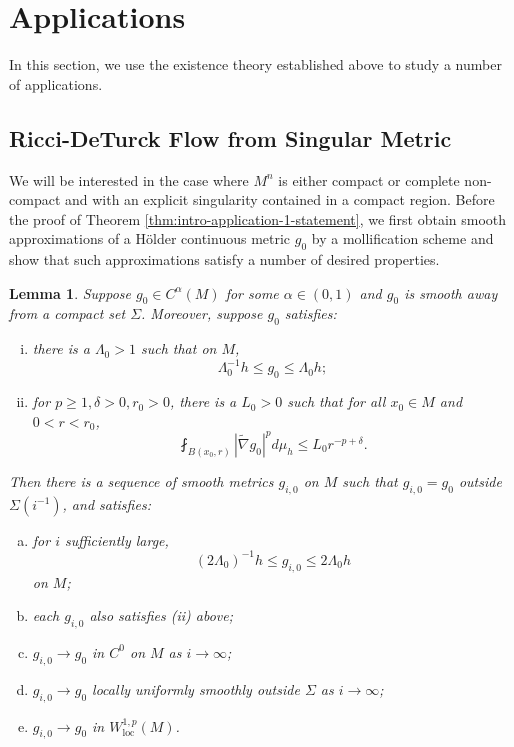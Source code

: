 \documentclass[12pt]{amsart}
\theoremstyle{plain}
\theoremstyle{plain}
\newtheorem{lemma}[subsection]{Lemma}
\theoremstyle{definition}
\theoremstyle{remark}
\numberwithin{equation}{subsection}
\newcommand{\hdel}{\tilde{\nabla}}
\begin{document}
\section{Applications}\label{sec:applications}

In this section, we use the existence theory established above to study a number of applications.

\subsection{Ricci-DeTurck Flow from Singular Metric}

We will be interested in the case where $M^n$ is either compact or complete non-compact and with an explicit singularity contained in a compact region. Before the proof of Theorem \ref{thm:intro-application-1-statement}, we first obtain smooth approximations of a H\"older continuous metric $g_0$ by a mollification scheme and show that such approximations satisfy a number of desired properties.

\begin{lemma}\label{lem:mollification-scheme}
    Suppose $g_0 \in C^\alpha(M)$ for some $\alpha \in (0,1)$ and $g_0$ is smooth away from a compact set $\Sigma$. Moreover, suppose $g_0$ satisfies:
    \begin{enumerate}[(i)]
        \item there is a $\Lambda_0 > 1$ such that on $M$,
        \begin{equation*}
            \Lambda_0^{-1}h \leq g_0 \leq \Lambda_0 h;
        \end{equation*}
        \item for $p \geq 1, \delta > 0, r_0 > 0$, there is a $L_0 > 0$ such that for all $x_0 \in M$ and $0 < r < r_0$,
        \begin{equation*}
            \fint_{B(x_0,r)} |\hdel g_0|^p d\mu_h \leq L_0 r^{-p+\delta}.
        \end{equation*}
    \end{enumerate}
    Then there is a sequence of smooth metrics $g_{i,0}$ on $M$ such that $g_{i,0} = g_0$ outside $\Sigma(i^{-1})$, and satisfies:
    \begin{enumerate}[(a)]
        \item for $i$ sufficiently large,
        \begin{equation*}
            (2\Lambda_0)^{-1}h \leq g_{i,0} \leq 2\Lambda_0 h
        \end{equation*}
        on $M$;
        \item each $g_{i,0}$ also satisfies (ii) above;
        \item $g_{i,0} \to g_0$ in $C^0$ on $M$ as $i \to \infty$;
        \item $g_{i,0} \to g_0$ locally uniformly smoothly outside $\Sigma$ as $i\to\infty$;
        \item $g_{i,0} \to g_0$ in $W^{1,p}_\text{loc}(M)$.
    \end{enumerate}
\end{lemma}
\end{document}
